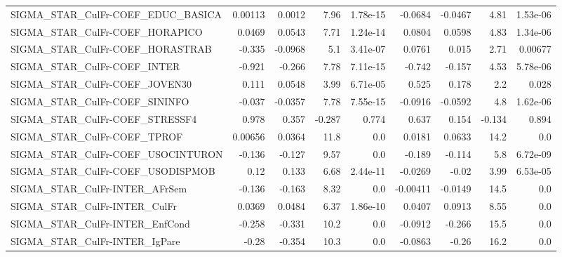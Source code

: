 \begin{tabular}{lrrrrrrrr}
SIGMA\_STAR\_CulFr-COEF\_EDUC\_BASICA     &     0.00113 &       0.0012 &    7.96 & 1.78e-15 &    -0.0684 &     -0.0467 &         4.81 &      1.53e-06 \\
SIGMA\_STAR\_CulFr-COEF\_HORAPICO        &      0.0469 &       0.0543 &    7.71 & 1.24e-14 &     0.0804 &      0.0598 &         4.83 &      1.34e-06 \\
SIGMA\_STAR\_CulFr-COEF\_HORASTRAB       &      -0.335 &      -0.0968 &     5.1 & 3.41e-07 &     0.0761 &       0.015 &         2.71 &       0.00677 \\
SIGMA\_STAR\_CulFr-COEF\_INTER           &      -0.921 &       -0.266 &    7.78 & 7.11e-15 &     -0.742 &      -0.157 &         4.53 &      5.78e-06 \\
SIGMA\_STAR\_CulFr-COEF\_JOVEN30         &       0.111 &       0.0548 &    3.99 & 6.71e-05 &      0.525 &       0.178 &          2.2 &         0.028 \\
SIGMA\_STAR\_CulFr-COEF\_SININFO         &      -0.037 &      -0.0357 &    7.78 & 7.55e-15 &    -0.0916 &     -0.0592 &          4.8 &      1.62e-06 \\
SIGMA\_STAR\_CulFr-COEF\_STRESSF4        &       0.978 &        0.357 &  -0.287 &    0.774 &      0.637 &       0.154 &       -0.134 &         0.894 \\
SIGMA\_STAR\_CulFr-COEF\_TPROF           &     0.00656 &       0.0364 &    11.8 &      0.0 &     0.0181 &      0.0633 &         14.2 &           0.0 \\
SIGMA\_STAR\_CulFr-COEF\_USOCINTURON     &      -0.136 &       -0.127 &    9.57 &      0.0 &     -0.189 &      -0.114 &          5.8 &      6.72e-09 \\
SIGMA\_STAR\_CulFr-COEF\_USODISPMOB      &        0.12 &        0.133 &    6.68 & 2.44e-11 &    -0.0269 &       -0.02 &         3.99 &      6.53e-05 \\
SIGMA\_STAR\_CulFr-INTER\_AFrSem         &      -0.136 &       -0.163 &    8.32 &      0.0 &   -0.00411 &     -0.0149 &         14.5 &           0.0 \\
SIGMA\_STAR\_CulFr-INTER\_CulFr          &      0.0369 &       0.0484 &    6.37 & 1.86e-10 &     0.0407 &      0.0913 &         8.55 &           0.0 \\
SIGMA\_STAR\_CulFr-INTER\_EnfCond        &      -0.258 &       -0.331 &    10.2 &      0.0 &    -0.0912 &      -0.266 &         15.5 &           0.0 \\
SIGMA\_STAR\_CulFr-INTER\_IgPare         &       -0.28 &       -0.354 &    10.3 &      0.0 &    -0.0863 &       -0.26 &         16.2 &           0.0 \\

\end{tabular}
